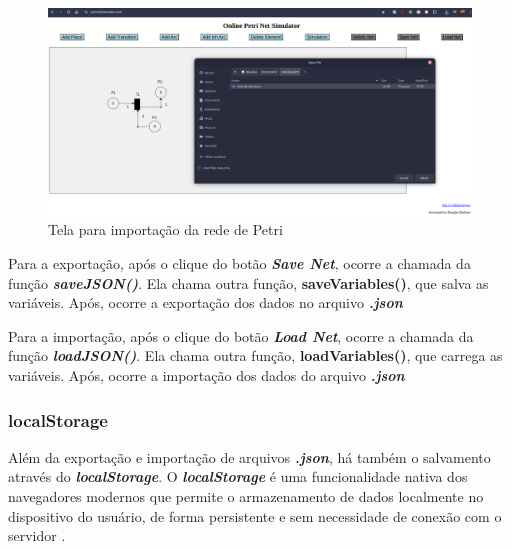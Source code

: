 \documentclass[
	12pt,				%
	openright,			%
	oneside,			%
	a4paper,			%
	english,			%
	brazil				%
	]{abntex2}
\begin{document}
\begin{figure}[ht] 
	\centering
	\includegraphics[scale=0.3]{figuras/loadNet.png}
	\caption[Tela para importação da rede de Petri]{Tela para importação da rede de Petri}
	\label{fig:loadNet}
\end{figure}
\FloatBarrier

Para a exportação, após o clique do botão \textbf{\textit{Save Net}}, ocorre a chamada da função \textbf{\textit{saveJSON()}}. Ela chama outra função, \textbf{saveVariables()}, que salva as variáveis. Após, ocorre a exportação dos dados no arquivo \textbf{\textit{.json}} 



Para a importação, após o clique do botão \textbf{\textit{Load Net}}, ocorre a chamada da função \textbf{\textit{loadJSON()}}. Ela chama outra função, \textbf{loadVariables()}, que carrega as variáveis. Após, ocorre a importação dos dados do arquivo \textbf{\textit{.json}} 



\subsubsection*{localStorage}\label{cap:localStorage} 

Além da exportação e importação de arquivos \textbf{\textit{.json}}, há também o salvamento através do \textbf{\textit{localStorage}}. O \textbf{\textit{localStorage}} é uma funcionalidade nativa dos navegadores modernos que permite o armazenamento de dados localmente no dispositivo do usuário, de forma persistente e sem necessidade de conexão com o servidor \cite{mdn_local_storage}. 
\end{document}
